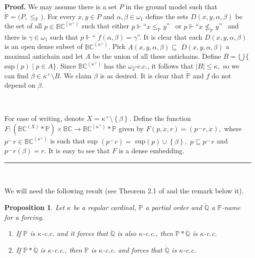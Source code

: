 \documentclass{article}
\newtheorem{proposition}[theorem]{Proposition}
\newenvironment{proof}[1][Proof]{\noindent\textbf{#1.} }{\ \rule{0.5em}{0.5em}}
\begin{document}
\begin{proof}
We may assume there is a set $P$ in the ground model such that $\mathbb{\dot
{P}=(}P,\leq_{\mathbb{\dot{P}}}\mathbb{)}.$ For every $x,y\in P$ and
$\alpha,\beta\in\omega_{1}$ define the sets $D\left(  x,y,\alpha,\beta\right)
$ be the set of all $p\in\mathbb{BC}^{\left(  \kappa^{+}\right)  }$ such that
either $p\Vdash$\textquotedblleft$x\leq_{\mathbb{\dot{P}}}y$\textquotedblright%
\ or $p\Vdash$\textquotedblleft$x\nleq_{\mathbb{\dot{P}}}y$\textquotedblright%
\ and there is $\gamma\in\omega_{1}$ such that $p\Vdash$\textquotedblleft%
$\dot{f}\left(  \alpha,\beta\right)  =\gamma$\textquotedblright. It is clear
that each $D\left(  x,y,\alpha,\beta\right)  $ is an open dense subset of
$\mathbb{BC}^{\left(  \kappa^{+}\right)  }.$ Pick $A\left(  x,y,\alpha
,\beta\right)  \subseteq$ $D\left(  x,y,\alpha,\beta\right)  $ a maximal
antichain and let $A$ be the union of all these antichains. Define
$B=\bigcup\{$\textsf{sup}$\left(  p\right)  \mid p\in A\}.$ Since
$\mathbb{BC}^{\left(  \kappa^{+}\right)  }$ has the $\omega_{2}$-\textsf{c.c.,
}it follows that $\left\vert B\right\vert \leq\kappa,$ so we can find
$\beta\in\kappa^{+}\setminus B.$ We claim $\beta$ is as desired. It is clear
that $\mathbb{\dot{P}}$ and $\dot{f}$ do not depend on $\beta.$

\qquad\qquad\qquad\qquad\ \ 

For ease of writing, denote $X=\kappa^{+}\setminus\left\{  \beta\right\}  .$
Define the function $F:(\mathbb{BC}^{(X)}\ast\mathbb{\dot{P}})\times
\mathbb{BC\longrightarrow BC}^{\left(  \kappa^{+}\right)  }\ast\mathbb{\dot
{P}}$ given by $F(p,\dot{x},r)=(p^{\frown}r,\dot{x}),$ where $p^{\frown}%
r\in\mathbb{BC}^{\left(  \kappa^{+}\right)  }$ is such that \textsf{sup}%
$\left(  p^{\frown}r\right)  =$ \textsf{sup}$\left(  p\right)  \cup\left\{
\beta\right\}  ,$ $p\subseteq p^{\frown}r$ and $p^{\frown}r\left(
\beta\right)  =r.$ It is easy to see that $F$ is a dense embedding.
\end{proof}

\qquad\qquad\ \ \ \ \ \ \ \ 

We will need the following result (see Theorem 2.1 of \cite{IteratedForcing}
and the remark below it).

\begin{proposition}
Let $\kappa$ be a regular cardinal, $\mathbb{P}$ a partial order and
$\mathbb{\dot{Q}}$ a $\mathbb{P}$-name for a forcing.
\label{Prop iteracion kcc}

\begin{enumerate}
\item If $\mathbb{P}$ is $\kappa$-\textsf{c.c.} and it forces that
$\mathbb{\dot{Q}}$ is also $\kappa$-\textsf{c.c., }then $\mathbb{P\ast\dot{Q}%
}$ is $\kappa$-\textsf{c.c. }

\item If $\mathbb{P\ast\dot{Q}}$ is $\kappa$-\textsf{c.c., }then $\mathbb{P}$
is $\kappa$-\textsf{c.c.} and forces that $\mathbb{\dot{Q}}$ is $\kappa
$-\textsf{c.c.}
\end{enumerate}
\end{proposition}
\end{document}
